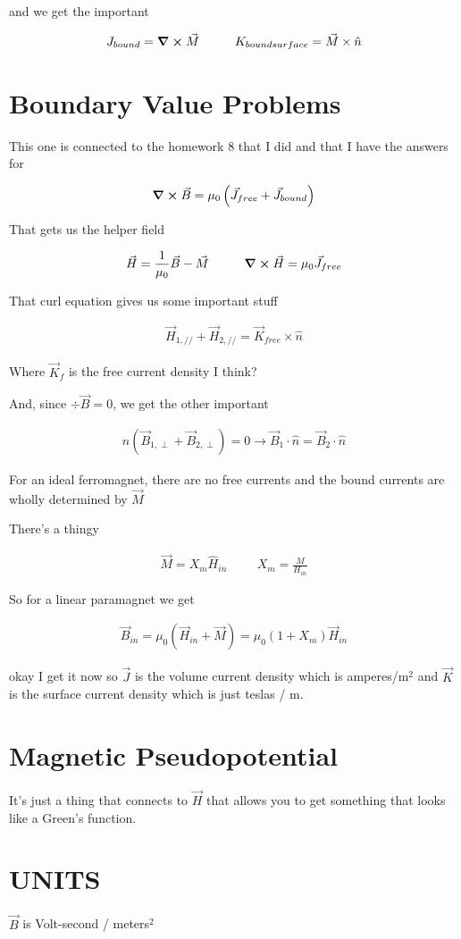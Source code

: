 \documentclass[fleqn]{report}
\newcommand{\hp}{\hspace{1cm}}
\newcommand{\equations} [1] {
\begin{gather*}
#1
\end{gather*}
}
\begin{document}
and we get the important 
\equations{
    J_{bound}
    =
    \curl \vec M 
    \hp 
    K_{bound surface}
    =
    \vec M \times \hat n 
}

\section{Boundary Value Problems}
This one is connected to the homework 8 that I did and that I have the answers for 

\equations{
    \curl \vec B 
    =
    \mu_0
    \left(
        \vec J_{free}
        +
        \vec J_{bound}
    \right)
}
That gets us the helper field 
\equations{
    \vec H 
    = 
    \frac{1}{\mu_0}
    \vec B 
    -
    \vec M
    \hp 
    \curl \vec H 
    =
    \mu_0 \vec J_{free}
}

That curl equation gives us some important stuff 
\equations{
    \vec H_{1, //}
    +
    \vec H_{2, //}
    =
    \vec K_{free}
    \times \hat n 
}
Where $\vec K_f$ is the free current density I think? 

And, since $\div \vec B = 0$, we get the other important 
\equations{
    \hat n(\vec B_{1, \perp} + \vec B_{2, \perp}) = 0 
    \rightarrow 
    \vec B_{1}
    \cdot \hat n
    =
    \vec B_{2}
    \cdot \hat n
}

For an ideal ferromagnet, there are no free currents and the bound 
currents are wholly determined by $\vec M$ 

There's a thingy 
\equations{
    \vec M 
    =
    X_m \hat H_{in}
    \hp 
    X_m 
    =
    \frac{M}{H_{in}}
}
So for a linear paramagnet we get 
\equations{
    \vec B_{in}
    =
    \mu_0 (\vec H_{in} + \vec M )
    =
    \mu_0 (1 + X_m) \vec H_{in}
}

okay I get it now 
so $\vec J$ is the volume current density which is amperes/m$^2$ and 
$\vec K$ is the surface current density which is just teslas / m. 

\section{Magnetic Pseudopotential}
It's just a thing that connects to $\vec H$ that allows you to get 
something that looks like a Green's function. 

\section{UNITS}
$\vec B$ is Volt-second / meters$^2$
\end{document}
